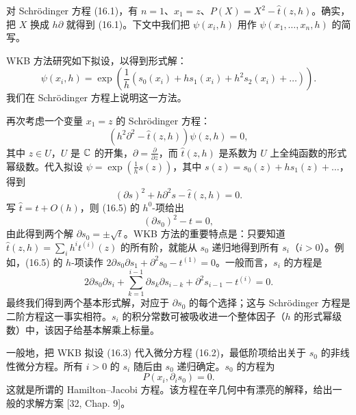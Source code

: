对 Schrödinger 方程 (16.1)，有 $n=1$、$x_1=z$、$P(X)=X^2-\hat t(z,h)$。确实，把 $X$ 换成 $h\partial$ 就得到 (16.1)。下文中我们把 $\psi(x_i,h)$ 用作 $\psi(x_1,\dots,x_n,h)$ 的简写。

WKB 方法研究如下拟设，以得到形式解：
\begin{equation}
\psi(x_i,h)=\exp\left(\frac1h\left(s_0(x_i)+hs_1(x_i)+h^2s_2(x_i)+\dots\right)\right).
\tag{16.3}
\end{equation}
我们在 Schrödinger 方程上说明这一方法。

\begin{example}[16.1] 再次考虑一个变量 $x_1=z$ 的 Schrödinger 方程：
\begin{equation}
(h^2\partial^2-\hat t(z,h))\psi(z,h)=0,
\tag{16.4}
\end{equation}
其中 $z\in U$，$U$ 是 $\mathbb{C}$ 的开集，$\partial=\frac{\partial}{\partial z}$，而 $\hat t(z,h)$ 是系数为 $U$ 上全纯函数的形式幂级数。代入拟设 $\psi=\exp\left(\frac1h s(z)\right)$，其中 $s(z)=s_0(z)+hs_1(z)+\dots$，得到
\begin{equation}
(\partial s)^2+h\partial^2s-\hat t(z,h)=0.
\tag{16.5}
\end{equation}
写 $\hat t=t+O(h)$，则 (16.5) 的 $h^0$-项给出
\[
(\partial s_0)^2-t=0,
\]
由此得到两个解 $\partial s_0=\pm\sqrt{t}$。WKB 方法的重要特点是：只要知道 $\hat t(z,h)=\sum_i h^it^{(i)}(z)$ 的所有阶，就能从 $s_0$ 递归地得到所有 $s_i$（$i>0$）。例如，(16.5) 的 $h$-项读作 $2\partial s_0\partial s_1+\partial^2s_0-t^{(1)}=0$。一般而言，$s_i$ 的方程是
\[
2\partial s_0\partial s_i+\sum_{k=1}^{i-1}\partial s_k\partial s_{i-k}+\partial^2s_{i-1}-t^{(i)}=0.
\]
最终我们得到两个基本形式解，对应于 $\partial s_0$ 的每个选择；这与 Schrödinger 方程是二阶方程这一事实相符。$s_i$ 的积分常数可被吸收进一个整体因子（$h$ 的形式幂级数）中，该因子给基本解乘上标量。\end{example}


一般地，把 WKB 拟设 (16.3) 代入微分方程 (16.2)，最低阶项给出关于 $s_0$ 的非线性微分方程。所有 $i>0$ 的 $s_i$ 随后由 $s_0$ 递归确定。$s_0$ 的方程为
\begin{equation}
P(x_i,\partial_is_0)=0.
\tag{16.6}
\end{equation}
这就是所谓的 Hamilton–Jacobi 方程。该方程在辛几何中有漂亮的解释，给出一般的求解方案 [32, Chap. 9]。

